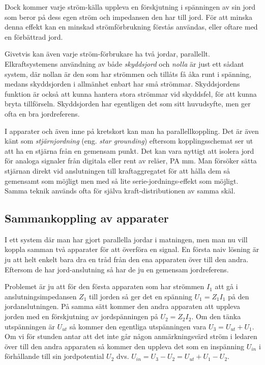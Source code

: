 Dock kommer varje ström-källa uppleva en förskjutning i spänningen av
sin jord som beror på dess egen ström och impedansen den har till jord. För att
minska denna effekt kan en minskad strömförbrukning förstås användas, eller
oftare med en förbättrad jord.

Givetvis kan även varje ström-förbrukare ha två jordar, parallellt.
Elkraftsystemens användning av både \emph{skyddsjord} och \emph{nolla} är
just ett sådant system, där nollan är den som har strömmen och tillåts få
åka runt i spänning, medans skyddsjorden i allmänhet enbart har små strömmar.
Skyddsjordens funktion är också att kunna hantera stora strömmar vid skyddsfel,
för att kunna bryta tillförseln. Skyddsjorden har egentligen det som
sitt huvudsyfte, men ger ofta en bra jordreferens.

I apparater och även inne på kretskort kan man ha parallellkoppling. Det är även
känt som \emph{stjärnjordning} (eng. \emph{star grounding}) eftersom
kopplingsschemat ser ut att ha en stjärna från en gemensam punkt. Det kan vara
nyttigt att isolera jord för analoga signaler från digitala eller rent av
reläer, PA mm. Man försöker sätta stjärnan direkt vid anslutningen till
kraftaggregatet för att hålla dem så gemensamt som möjligt men med så lite
serie-jordnings-effekt som möjligt. Samma teknik används ofta för själva
kraft-distributionen av samma skäl.

\subsection{Sammankoppling av apparater}
\label{sammankopplingavapparater}

I ett system där man har gjort parallella jordar i matningen,
men man nu vill koppla samman två apparater för att överföra en signal.
En första naiv lösning är ju att helt enkelt bara dra en tråd från den ena
apparaten över till den andra. Eftersom de har jord-anslutning så har de ju en
gemensam jordreferens.

Problemet är ju att för den första apparaten som har strömmen \(I_1\) att gå i
anslutningsimpedansen \(Z_1\) till jorden så ger det en spänning
\(U_1 = Z_1 I_1\) på den jordanslutningen. På samma sätt kommer den
andra apparaten att uppleva jorden med en förskjutning av jordspänningen på
\(U_2 = Z_2 I_2\). Om den tänka utspänningen är \(U_{ut}\) så kommer den
egentliga utspänningen vara \(U_3 = U_{ut} + U_1\). Om vi för stunden antar att
det inte går någon anmärkningsvärd ström i ledaren över till den andra
apparaten så kommer den uppleva det som en inspänning \(U_{in}\) i förhållande
till sin jordpotential \(U_2\) dvs. \(U_{in} = U_3 - U_2 = U_{ut} + U_1 - U_2\).

